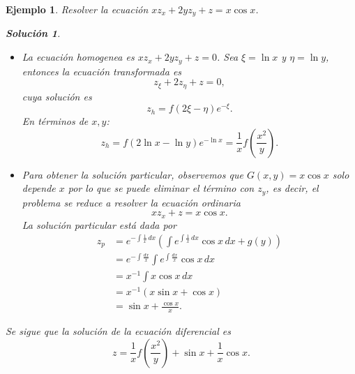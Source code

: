 \documentclass[11pt,letterpaper,draft]{report}
\newtheorem{example}[defn]{Ejemplo}
\newtheorem*{sol}{Solución}
\newcommand\<{\langle}
\renewcommand\>{\rangle}
\begin{document}
\begin{example}
  Resolver la ecuación $x z_x + 2y z_y + z = x\cos x$.
  \begin{sol}
    \begin{itemize}
      \item La ecuación homogenea es $xz_x+2yz_y + z=0$. Sea
        $\xi = \ln x$ y $\eta = \ln y$, entonces la ecuación
        transformada es
        \[
          z_\xi + 2z_\eta + z = 0,
        \] 
        cuya solución es
        \[
          z_h = f(2\xi - \eta)e^{-\xi}.
        \] 
        En términos de $x,y$:
        \[
        z_h = f(2\ln x - \ln y)e^{-\ln x} = \frac{1}{x}
        f\left(\frac{x^2}{y}\right).
        \] 
      \item Para obtener la solución particular, observemos
        que $G(x,y) = x \cos x$ solo depende $x$ por lo que
        se puede eliminar el término con $z_y$, es decir, el
        problema se reduce a resolver la ecuación ordinaria
        \[
        x z_x + z = x\cos x.
        \] 
        La solución particular está dada por
        \begin{align*}
          z_p &= e^{-\int \frac{1}{x}\, dx} \left(\int
            e^{\int \frac{1}{x} \, dx} \cos x \, dx +
            g(y)\right)\\
              &= e^{-\int \frac{dx}{x}} \int e^{\int
              \frac{dx}{x}} \cos x \, dx\\
              &= x^{-1} \int x\cos x \, dx\\
              &= x^{-1}\left(x\sin x + \cos x\right)\\
              &= \sin x + \frac{\cos x}{x}.
        \end{align*}
    \end{itemize}
    Se sigue que la solución de la ecuación diferencial es
    \[
    z = \frac{1}{x}f\left(\frac{x^2}{y}\right) + \sin x +
      \frac{1}{x} \cos x.
    \] 
  \end{sol}
\end{example}
\end{document}
